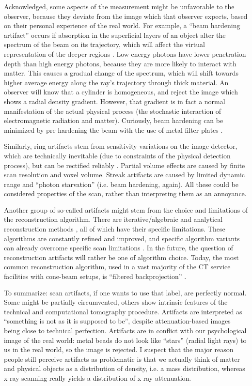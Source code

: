 Acknowledged, some aspects of the measurement might be unfavorable to the observer, because they deviate from the image which that observer expects, based on their personal experience of the real world.
For example, a ``beam hardening artifact'' occurs if absorption in the superficial layers of an object alter the spectrum of the beam on its trajectory, which will affect the virtual representation of the deeper regions \citep{VanGompel2011}.
Low energy photons have lower penetration depth than high energy photons, because they are more likely to interact with matter.
This causes a gradual change of the spectrum, which will shift towards higher average energy along the ray's trajectory through thick material.
An observer will know that a cylinder is homogeneous, and reject the image which shows a radial density gradient.
However, that gradient is in fact a normal manifestation of the actual physical process (the stochastic interaction of electromagnetic radiation and matter).
Curiously, beam hardening can be minimized by pre-hardening the beam with the use of metal filter plates \citep{Triche2019}.

Similarly, ring artifacts stem from sensitivity variations on the image detector, which are technically inevitable (due to constraints of the physical detection process), but can be rectified reliably \citep{Sijbers2004}.
Partial volume effects are caused by finite scan resolution and voxel volume.
Streak artifacts are caused by limited dynamic range and ``photon starvation'' (i.e. beam hardening, again).
All these could be considered properties of the scan, rather than interpreting them as an annoyance.

Another group of so-called artifacts might stem from the choice and limitations of the reconstruction algorithm.
There are iterative/algebraic and analytical reconstruction methods \citep{Gilbert1972,Andersen1984,Feldkamp1984,Geyer2015,Hansen2021}, all of which have their specific limitations.
These algorithms are constantly refined and improved, and specific algorithm variants can already overcome specific scan limitations \citep[e.g.][]{Six2019,Frenkel2022}.
In the future, the question of reconstruction artifacts will rather be one of algorithm choice.
Today, the most common reconstruction algorithm, used in a vast majority of the CT service facilities with cone-beam setups, is ``filtered backprojection'' \citep[FBP, or Feldkamp/Davis/Kress = FDK algorithm;][]{Feldkamp1984}.


To summarize: scan artifacts, if one wants to use that label, are perfectly normal.
Some might be partially circumvented, others show intrinsic features of the technical and computational tomography procedure.
Artifacts are interpreted as ``something is not as it is supposed to be'', despite attenuation-based images being close to technical perfection.
Artifacts are in conflict with our psychological image of the real world: metal beads do not look like ``stars'' (radial light rays) to us in the real world, so the image is rejected.
I suspect that the major reason people still perceive artifacts as problematic is that we actually think of matter and physical objects as a distribution of density, i.e. a mass distribution, whereas x-ray scanning really yields a distribution of x-ray attenuation.

